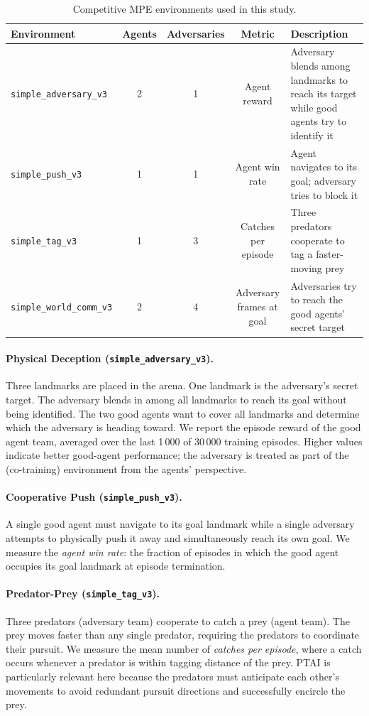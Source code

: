 \documentclass[12pt]{article}
\begin{document}
\begin{table}[H]
\centering
\caption{Competitive MPE environments used in this study.}
\label{tab:envs}
\begin{tabular}{lcccp{4.2cm}}
\toprule
Environment & Agents & Adversaries & Metric & Description \\
\midrule
\texttt{simple\_adversary\_v3}   & 2 & 1 & Agent reward          & Adversary blends among landmarks to reach its target while good agents try to identify it \\
\texttt{simple\_push\_v3}        & 1 & 1 & Agent win rate        & Agent navigates to its goal; adversary tries to block it \\
\texttt{simple\_tag\_v3}         & 1 & 3 & Catches per episode   & Three predators cooperate to tag a faster-moving prey \\
\texttt{simple\_world\_comm\_v3} & 2 & 4 & Adversary frames at goal & Adversaries try to reach the good agents' secret target \\
\bottomrule
\end{tabular}
\end{table}

\paragraph{Physical Deception (\texttt{simple\_adversary\_v3}).}
Three landmarks are placed in the arena. One landmark is the adversary's secret target.
The adversary blends in among all landmarks to reach its goal without being identified.
The two good agents want to cover all landmarks and determine which the adversary is
heading toward. We report the episode reward of the good agent team, averaged over the
last 1\,000 of 30\,000 training episodes. Higher values indicate better good-agent
performance; the adversary is treated as part of the (co-training) environment from the
agents' perspective.

\paragraph{Cooperative Push (\texttt{simple\_push\_v3}).}
A single good agent must navigate to its goal landmark while a single adversary attempts
to physically push it away and simultaneously reach its own goal. We measure the
\emph{agent win rate}: the fraction of episodes in which the good agent occupies its
goal landmark at episode termination.

\paragraph{Predator-Prey (\texttt{simple\_tag\_v3}).}
Three predators (adversary team) cooperate to catch a prey (agent team). The prey moves
faster than any single predator, requiring the predators to coordinate their pursuit.
We measure the mean number of \emph{catches per episode}, where a catch occurs whenever
a predator is within tagging distance of the prey. PTAI is particularly relevant here
because the predators must anticipate each other's movements to avoid redundant pursuit
directions and successfully encircle the prey.
\end{document}
